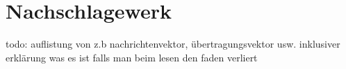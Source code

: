 \section{Nachschlagewerk
	\label{reedsolomon:section:nachschlagen}}
todo: auflistung von z.b nachrichtenvektor, übertragungsvektor usw. inklusiver erklärung was es ist falls man beim lesen den faden verliert